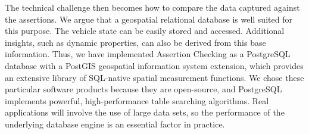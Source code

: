 The technical challenge then becomes how to compare the data captured against the assertions. We argue that a geospatial relational database is well suited for this purpose. The vehicle state can be easily stored and accessed. Additional insights, such as dynamic properties, can also be derived from this base information. 
%
Thus, we have implemented Assertion Checking as a PostgreSQL database with a PostGIS geospatial information system extension, which provides an extensive library of SQL-native spatial measurement functions. We chose these particular software products because they are open-source, and PostgreSQL implements powerful, high-performance table searching algorithms.
Real applications will involve the use of large data sets, so the performance of the underlying database engine is an essential factor in practice. %





